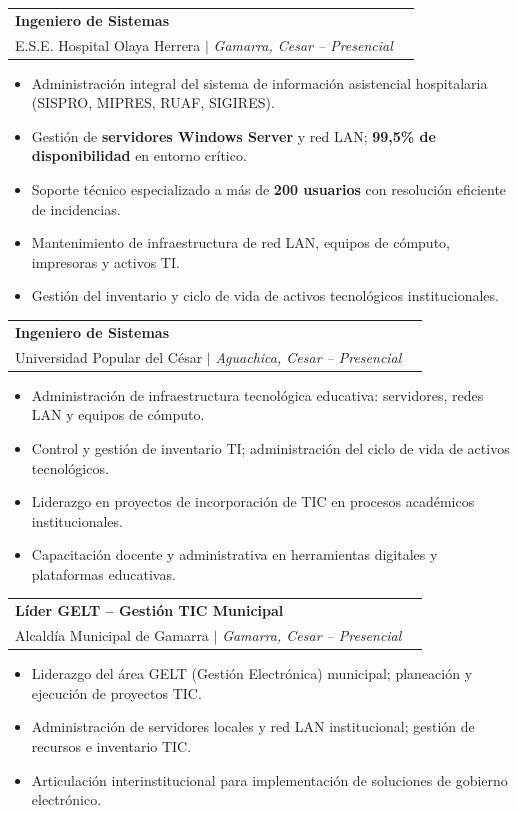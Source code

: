 \documentclass[10pt, letterpaper]{article}
\makeatletter
\newcommand{\cventry}[5]{%
  \noindent
  \begin{tabularx}{\linewidth}{@{}X r@{}}
    {\bfseries\color{primary} #1} & \cellcolor{accentlight}{\small\color{accent}\bfseries #2} \\
    {\small\color{accent} #3} \textcolor{medgray}{$|$} {\small\color{darkgray}\itshape #4} & \\
  \end{tabularx}
  \vspace{2pt}
  #5
  \vspace{6pt}
}
\newcommand{\keyword}[1]{\textbf{#1}}
\makeatother
\begin{document}
\cventry
  {Ingeniero de Sistemas}
  {Feb 2023 – Jul 2024}
  {E.S.E. Hospital Olaya Herrera}
  {Gamarra, Cesar – Presencial}
  {
    \begin{itemize}
      \item Administración integral del sistema de información asistencial hospitalaria (SISPRO, MIPRES, RUAF, SIGIRES).
      \item Gestión de \keyword{servidores Windows Server} y red LAN; \textbf{99,5\% de disponibilidad} en entorno crítico.
      \item Soporte técnico especializado a más de \textbf{200 usuarios} con resolución eficiente de incidencias.
      \item Mantenimiento de infraestructura de red LAN, equipos de cómputo, impresoras y activos TI.
      \item Gestión del inventario y ciclo de vida de activos tecnológicos institucionales.
    \end{itemize}
  }

\cventry
  {Ingeniero de Sistemas}
  {Feb 2022 – Jul 2022}
  {Universidad Popular del César}
  {Aguachica, Cesar – Presencial}
  {
    \begin{itemize}
      \item Administración de infraestructura tecnológica educativa: servidores, redes LAN y equipos de cómputo.
      \item Control y gestión de inventario TI; administración del ciclo de vida de activos tecnológicos.
      \item Liderazgo en proyectos de incorporación de TIC en procesos académicos institucionales.
      \item Capacitación docente y administrativa en herramientas digitales y plataformas educativas.
    \end{itemize}
  }

\cventry
  {Líder GELT – Gestión TIC Municipal}
  {Jun 2015 – Feb 2016}
  {Alcaldía Municipal de Gamarra}
  {Gamarra, Cesar – Presencial}
  {
    \begin{itemize}
      \item Liderazgo del área GELT (Gestión Electrónica) municipal; planeación y ejecución de proyectos TIC.
      \item Administración de servidores locales y red LAN institucional; gestión de recursos e inventario TIC.
      \item Articulación interinstitucional para implementación de soluciones de gobierno electrónico.
    \end{itemize}
  }
\end{document}
